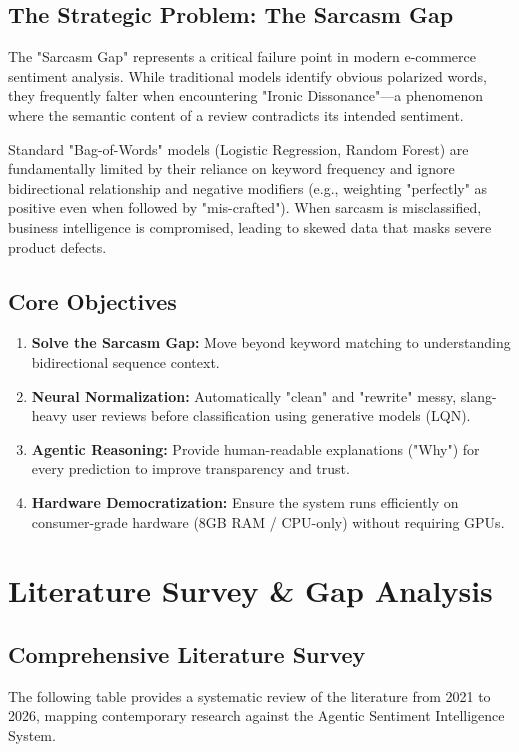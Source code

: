 \documentclass[11pt,oneside]{scrbook}
\begin{document}
\section{The Strategic Problem: The Sarcasm Gap}
The "Sarcasm Gap" represents a critical failure point in modern e-commerce sentiment analysis. While traditional models identify obvious polarized words, they frequently falter when encountering "Ironic Dissonance"---a phenomenon where the semantic content of a review contradicts its intended sentiment. 

Standard "Bag-of-Words" models (Logistic Regression, Random Forest) are fundamentally limited by their reliance on keyword frequency and ignore bidirectional relationship and negative modifiers (e.g., weighting "perfectly" as positive even when followed by "mis-crafted"). When sarcasm is misclassified, business intelligence is compromised, leading to skewed data that masks severe product defects.

\section{Core Objectives}
\begin{enumerate}
    \item \textbf{Solve the Sarcasm Gap:} Move beyond keyword matching to understanding bidirectional sequence context.
    \item \textbf{Neural Normalization:} Automatically "clean" and "rewrite" messy, slang-heavy user reviews before classification using generative models (LQN).
    \item \textbf{Agentic Reasoning:} Provide human-readable explanations ("Why") for every prediction to improve transparency and trust.
    \item \textbf{Hardware Democratization:} Ensure the system runs efficiently on consumer-grade hardware (8GB RAM / CPU-only) without requiring GPUs.
\end{enumerate}

\chapter{Literature Survey \& Gap Analysis}

\section{Comprehensive Literature Survey}
The following table provides a systematic review of the literature from 2021 to 2026, mapping contemporary research against the Agentic Sentiment Intelligence System.
\end{document}
